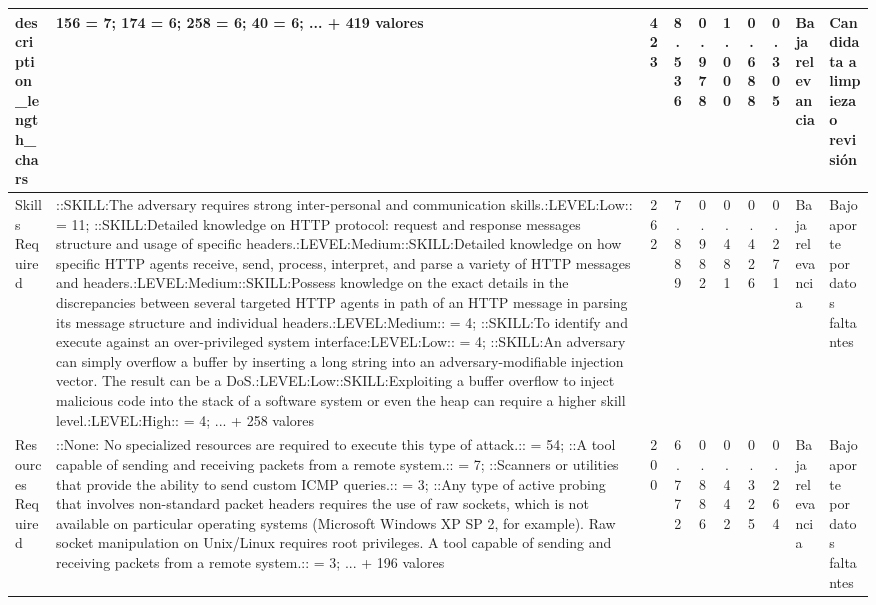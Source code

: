 \begin{table}[h]
\begin{tabular}{|p{2.1cm}|p{3.0cm}|c|c|c|c|c|c|p{2.5cm}|p{2.8cm}|}
description\_length\_chars & 156 = 7; 174 = 6; 258 = 6; 40 = 6; ... + 419 valores & 423 & 8.536 & 0.978 & 1.000 & 0.688 & 0.305 & Baja relevancia & Candidata a limpieza o revisión \\
\hline
Skills Required & ::SKILL:The adversary requires strong inter-personal and communication skills.:LEVEL:Low:: = 11; ::SKILL:Detailed knowledge on HTTP protocol: request and response messages structure and usage of specific headers.:LEVEL:Medium::SKILL:Detailed knowledge on how specific HTTP agents receive, send, process, interpret, and parse a variety of HTTP messages and headers.:LEVEL:Medium::SKILL:Possess knowledge on the exact details in the discrepancies between several targeted HTTP agents in path of an HTTP message in parsing its message structure and individual headers.:LEVEL:Medium:: = 4; ::SKILL:To identify and execute against an over-privileged system interface:LEVEL:Low:: = 4; ::SKILL:An adversary can simply overflow a buffer by inserting a long string into an adversary-modifiable injection vector. The result can be a DoS.:LEVEL:Low::SKILL:Exploiting a buffer overflow to inject malicious code into the stack of a software system or even the heap can require a higher skill level.:LEVEL:High:: = 4; ... + 258 valores & 262 & 7.889 & 0.982 & 0.481 & 0.426 & 0.271 & Baja relevancia & Bajo aporte por datos faltantes \\
\hline
Resources Required & ::None: No specialized resources are required to execute this type of attack.:: = 54; ::A tool capable of sending and receiving packets from a remote system.:: = 7; ::Scanners or utilities that provide the ability to send custom ICMP queries.:: = 3; ::Any type of active probing that involves non-standard packet headers requires the use of raw sockets, which is not available on particular operating systems (Microsoft Windows XP SP 2, for example). Raw socket manipulation on Unix/Linux requires root privileges. A tool capable of sending and receiving packets from a remote system.:: = 3; ... + 196 valores & 200 & 6.772 & 0.886 & 0.442 & 0.325 & 0.264 & Baja relevancia & Bajo aporte por datos faltantes \\
\hline

\end{tabular}
\end{table}
